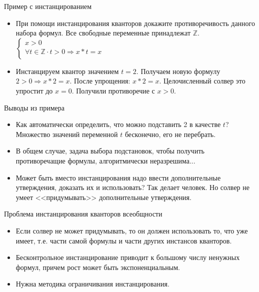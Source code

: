 \documentclass[hyperref={unicode=true}]{beamer}
\begin{document}
    \begin{frame}{Пример с инстанцированием}
    \begin{itemize}
    \item При помощи инстанцирования кванторов докажите противоречивость
    данного набора формул. Все свободные переменные принадлежат $\mathbb{Z}$.
    $\begin{cases}
    x > 0\\
    \forall t \in \mathbb{Z} \cdot t > 0 \Rightarrow x * t = x\\
    \end{cases}$
    \item
    Инстанцируем квантор значением $t = 2$. Получаем новую формулу
    $2 > 0 \Rightarrow x * 2 = x$. После упрощения: $x * 2 = x$.
    Целочисленный солвер это упростит до $x = 0$. Получили
    противоречие с $x > 0$.
    \end{itemize}
    \end{frame}

    \begin{frame}{Выводы из примера}
    \begin{itemize}
    \item
    Как автоматически определить, что можно подставить 2 в качестве $t$?
    Множество значений переменной $t$ бесконечно, его не перебрать.
    \item
    В общем случае, задача выбора подстановок, чтобы
    получить противоречащие формулы, алгоритмически неразрешима...
    \item
    Может быть вместо инстанцирования надо ввести дополнительные утверждения,
    доказать их и использовать? Так делает человек.
    Но солвер не умеет <<придумывать>> дополнительные утверждения.
    \end{itemize}
    \end{frame}

    \begin{frame}{Проблема инстанцирования кванторов всеобщности}
    \begin{itemize}
    \item
    Если солвер не может придумывать, то он должен использовать то, что
    уже имеет, т.е. части самой формулы и части других инстансов кванторов.
    \item
    Бесконтрольное инстанцирование приводит к большому числу ненужных
    формул, причем рост может быть экспоненциальным.
    \item
    Нужна методика ограничивания инстанцирования.
    \end{itemize}
    \end{frame}
\end{document}
